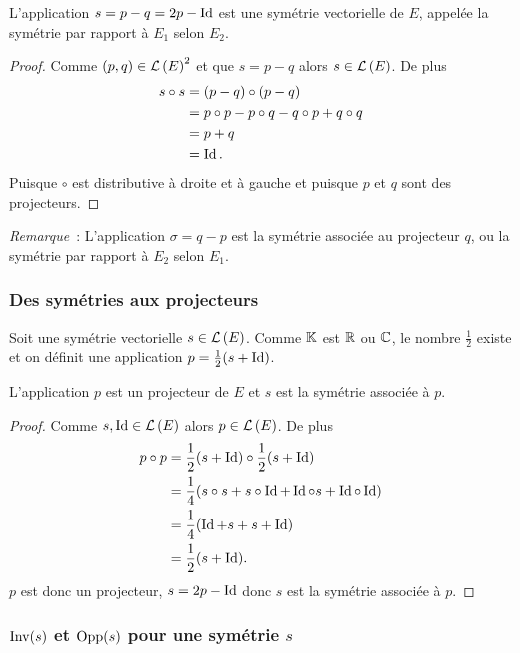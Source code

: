 \begin{prop}
  L'application \(s=p-q=2p-\operatorname{Id}\) est une symétrie vectorielle de \(E\), appelée la symétrie par rapport à \(E_1\) selon \(E_2\).
\end{prop}
\begin{proof}
  Comme \((p,q) \in \mathcal{L}\left(E\right)^2\) et que \(s=p-q\) alors \(s \in \mathcal{L}\left(E\right)\). De plus
  \begin{align}
    s \circ s &=(p-q) \circ (p-q)\\
    &=p \circ p -p \circ q -q \circ p +q \circ q\\
    &=p+q\\
    &=\operatorname{Id}.
  \end{align}
  Puisque \(\circ\) est distributive à droite et à gauche et puisque \(p\) et \(q\) sont des projecteurs.
\end{proof}

\emph{Remarque}~: L'application \(\sigma=q-p\) est la symétrie associée au projecteur \(q\), ou la symétrie par rapport à \(E_2\) selon \(E_1\).

\subsubsection{Des symétries aux projecteurs}

Soit une symétrie vectorielle \(s \in \mathcal{L}\left(E\right)\). Comme \(\mathbb{K}\) est \(\mathbb{R}\) ou \(\mathbb{C}\), le nombre \(\frac{1}{2}\) existe et on définit une application \(p = \frac{1}{2}(s+\operatorname{Id})\).

\begin{prop}
  L'application \(p\) est un projecteur de \(E\) et \(s\) est la symétrie associée à \(p\).
\end{prop}
\begin{proof}
  Comme \(s, \operatorname{Id} \in \mathcal{L}\left(E\right)\) alors \(p \in \mathcal{L}\left(E\right)\). De plus
  \begin{align}
    p \circ p &= \frac{1}{2}(s+\operatorname{Id}) \circ \frac{1}{2}(s+\operatorname{Id}) \\
    &=\frac{1}{4}(s \circ s + s\circ \operatorname{Id} +\operatorname{Id} \circ s +\operatorname{Id} \circ \operatorname{Id})\\
    &=\frac{1}{4}(\operatorname{Id} +s +s+\operatorname{Id})\\
    &=\frac{1}{2}(s+\operatorname{Id}).
  \end{align}
\(p\) est donc un projecteur, \(s=2p-\operatorname{Id}\) donc \(s\) est la symétrie associée à \(p\).
\end{proof}

\subsubsection{\(\operatorname{Inv}(s)\) et \(\operatorname{Opp}(s)\) pour une symétrie \(s\)}

